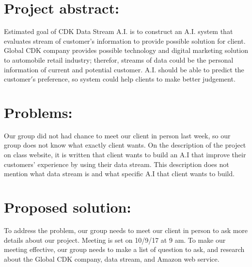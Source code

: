 \documentclass[onecolumn, draftclsnofoot,10pt, compsoc]{IEEEtran}
\begin{document}
\section{Project abstract:}
Estimated goal of CDK Data Stream A.I. is to construct an A.I. system that evaluates stream of customer$’$s information to provide possible solution for client. Global CDK company provides possible technology and digital marketing solution to automobile retail industry; therefor, streams of data could be the personal information of current and potential customer. A.I. should be able to predict the customer$'$s preference, so system could help clients to make better judgement. 

\section{Problems:}
Our group did not had chance to meet our client in person last week, so our group does not know what exactly client wants. On the description of the project on class website, it is written that client wants to build an A.I that improve their customers$’$ experience by using their data stream. This description does not mention what data stream is and what specific A.I that client wants to build. 

\section{Proposed solution:}
To address the problem, our group needs to meet our client in person to ask more details about our project. Meeting is set on 10/9/17 at 9 am. To make our meeting effective, our group needs to make a list of question to ask, and research about the Global CDK company, data stream, and Amazon web service.
\end{document}
